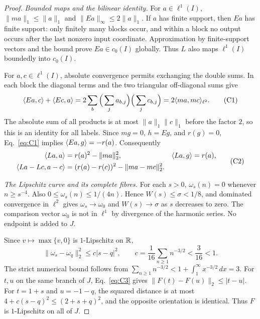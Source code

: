 \begin{proof}
\noindent\textit{Bounded maps and the bilinear identity.}
\label{sec:C1}
For $a\in\ell^1(I)$, $\|ma\|_1\le\|a\|_1$ and
$\|Ea\|_\infty\le2\|a\|_1$. If $a$ has finite support, then $Ea$ has
finite support: only finitely many blocks occur, and within a block no
output occurs after the last nonzero input coordinate. Approximation by
finite-support vectors and the bound prove $Ea\in c_0(I)$ globally.
Thus $L$ also maps $\ell^1(I)$ boundedly into $c_0(I)$.

For $a,c\in\ell^1(I)$, absolute convergence permits exchanging the double
sums. In each block the diagonal terms and the two triangular
off-diagonal sums give
\begin{equation}
\langle Ea,c\rangle+\langle Ec,a\rangle
 =2\sum_b\Big(\sum_j a_{b,j}\Big)\Big(\sum_j c_{b,j}\Big)
 =2\langle ma,mc\rangle_{\ell^2}.
\tag{C1}\label{eq:C1}
\end{equation}
The absolute sum of all products is at most $\|a\|_1\|c\|_1$ before the
factor $2$, so this is an identity for all labels. Since $mg=0$, $h=Eg$,
and $r(g)=0$, Eq.~\eqref{eq:C1} implies $\langle Ea,g\rangle=-r(a)$.
Consequently
\begin{equation}
\begin{aligned}
\langle La,a\rangle&=r(a)^2-\|ma\|_2^2,&
\langle La,g\rangle&=r(a),\\
\langle La-Lc,a-c\rangle&=(r(a)-r(c))^2-\|ma-mc\|_2^2.
\end{aligned}
\tag{C2}\label{eq:C2}
\end{equation}

\noindent\textit{The Lipschitz curve and its complete fibres.}
\label{sec:C2}
For each $s>0$, $\omega_s(n)=0$ whenever $n\ge s^{-4}$. Also
$0\le\omega_s(n)\le1/(4n)$. Hence $W(s)\le\sigma<1/8$, and dominated
convergence in $\ell^2$ gives $\omega_s\to\omega_0$ and $W(s)\to\sigma$
as $s$ decreases to zero. The comparison vector $\omega_0$ is not in
$\ell^1$ by divergence of the harmonic series. No endpoint is added to $J$.

Since $v\mapsto\max\{v,0\}$ is $1$-Lipschitz on $\mathbb R$,
\begin{equation}
\|\omega_s-\omega_q\|_2^2\le c|s-q|^2,\qquad
c=\frac1{16}\sum_{n\ge1}n^{-3/2}<\frac3{16}<1.
\tag{C3}\label{eq:C3}
\end{equation}
The strict numerical bound follows from
$\sum_{n\ge1}n^{-3/2}<1+\int_1^\infty x^{-3/2}\,dx=3$.
For $t,u$ on the same branch of $J$, Eq.~\eqref{eq:C3} gives
$\|F(t)-F(u)\|_2\le|t-u|$. For $t=1+s$ and $u=-1-q$, the squared
distance is at most $4+c(s-q)^2\le(2+s+q)^2$, and the opposite
orientation is identical. Thus $F$ is $1$-Lipschitz on all of $J$.


\end{proof}
